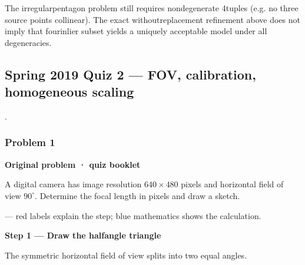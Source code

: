 \documentclass[letterpaper,11pt,english,openany,oneside]{jupyterBook}
\begin{document}
\par

\sphinxAtStartPar
{} The irregular\sphinxhyphen{}pentagon problem still requires nondegenerate 4\sphinxhyphen{}tuples (e.g. no three source points collinear). The exact without\sphinxhyphen{}replacement refinement above does not imply that  four\sphinxhyphen{}inlier subset yields a uniquely acceptable model under all degeneracies.


\subsection{Spring 2019 Quiz 2 — FOV, calibration, homogeneous scaling}
\label{\detokenize{lectures/lecture03/quiz-workbook:spring-2019-quiz-2-fov-calibration-homogeneous-scaling}}\label{\detokenize{lectures/lecture03/quiz-workbook:quiz-source-10}}
\sphinxAtStartPar
{} .


\subsubsection{Problem 1}
\label{\detokenize{lectures/lecture03/quiz-workbook:problem-1}}\label{\detokenize{lectures/lecture03/quiz-workbook:quiz-10-q1}}\label{\detokenize{lectures/lecture03/quiz-workbook:ex-lec03-calibration}}
\par\medskip\textbf{Original problem · quiz booklet}\par\smallskip

\sphinxAtStartPar
A digital camera has image resolution \(640\times480\) pixels and horizontal field of view \(90^\circ\). Determine the focal length in pixels and draw a sketch.

\par\medskip

\sphinxAtStartPar
{} — red labels explain the step; blue mathematics shows the calculation.

\par\medskip{}
{\color{QuizStepRed}\bfseries Step 1 — Draw the half\sphinxhyphen{}angle triangle}\par\smallskip

\sphinxAtStartPar
{} The symmetric horizontal field of view splits into two equal angles.
\end{document}
